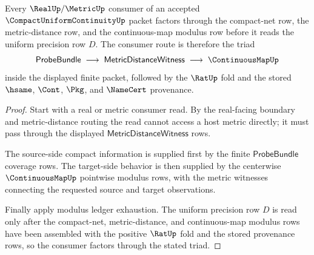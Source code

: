 \begin{theorem}
\label{thm:compact-uniform-continuity-real-metric-consumer-triad}
Every $\RealUp/\MetricUp$ consumer of an accepted $\CompactUniformContinuityUp$ packet factors through the compact-net row, the metric-distance row, and the continuous-map modulus row before it reads the uniform precision row $D$. The consumer route is therefore the triad
$$
\mathsf{ProbeBundle}\;\longrightarrow\;\mathsf{MetricDistanceWitness}\;\longrightarrow\;\ContinuousMapUp
$$
inside the displayed finite packet, followed by the $\RatUp$ fold and the stored $\hsame$, $\Cont$, $\Pkg$, and $\NameCert$ provenance.
\end{theorem}
\begin{proof}
Start with a real or metric consumer read. By the real-facing boundary and metric-distance routing the read cannot access a host metric directly; it must pass through the displayed $\mathsf{MetricDistanceWitness}$ rows.

The source-side compact information is supplied first by the finite $\mathsf{ProbeBundle}$ coverage rows. The target-side behavior is then supplied by the centerwise $\ContinuousMapUp$ pointwise modulus rows, with the metric witnesses connecting the requested source and target observations.

Finally apply modulus ledger exhaustion. The uniform precision row $D$ is read only after the compact-net, metric-distance, and continuous-map modulus rows have been assembled with the positive $\RatUp$ fold and the stored provenance rows, so the consumer factors through the stated triad.
\end{proof}

